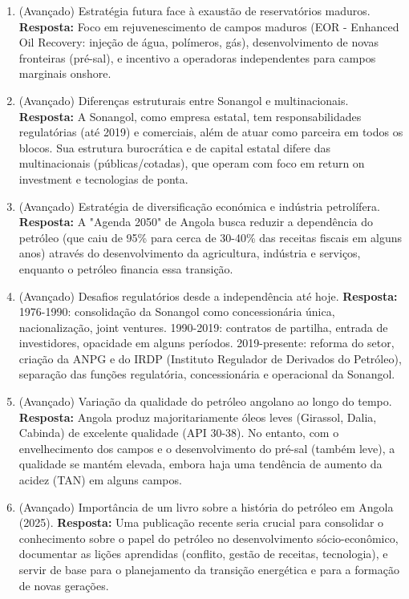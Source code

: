 \documentclass[11pt,a4paper]{article}
\begin{document}
\begin{enumerate}
  \item (Avançado) Estratégia futura face à exaustão de reservatórios maduros.
  \textbf{Resposta:} Foco em rejuvenescimento de campos maduros (EOR - Enhanced Oil Recovery: injeção de água, polímeros, gás), desenvolvimento de novas fronteiras (pré-sal), e incentivo a operadoras independentes para campos marginais onshore.

  \item (Avançado) Diferenças estruturais entre Sonangol e multinacionais.
  \textbf{Resposta:} A Sonangol, como empresa estatal, tem responsabilidades regulatórias (até 2019) e comerciais, além de atuar como parceira em todos os blocos. Sua estrutura burocrática e de capital estatal difere das multinacionais (públicas/cotadas), que operam com foco em return on investment e tecnologias de ponta.

  \item (Avançado) Estratégia de diversificação económica e indústria petrolífera.
  \textbf{Resposta:} A "Agenda 2050" de Angola busca reduzir a dependência do petróleo (que caiu de 95\% para cerca de 30-40\% das receitas fiscais em alguns anos) através do desenvolvimento da agricultura, indústria e serviços, enquanto o petróleo financia essa transição.

  \item (Avançado) Desafios regulatórios desde a independência até hoje.
  \textbf{Resposta:} 1976-1990: consolidação da Sonangol como concessionária única, nacionalização, joint ventures. 1990-2019: contratos de partilha, entrada de investidores, opacidade em alguns períodos. 2019-presente: reforma do setor, criação da ANPG e do IRDP (Instituto Regulador de Derivados do Petróleo), separação das funções regulatória, concessionária e operacional da Sonangol.

  \item (Avançado) Variação da qualidade do petróleo angolano ao longo do tempo.
  \textbf{Resposta:} Angola produz majoritariamente óleos leves (Girassol, Dalia, Cabinda) de excelente qualidade (API 30-38). No entanto, com o envelhecimento dos campos e o desenvolvimento do pré-sal (também leve), a qualidade se mantém elevada, embora haja uma tendência de aumento da acidez (TAN) em alguns campos.

  \item (Avançado) Importância de um livro sobre a história do petróleo em Angola (2025).
  \textbf{Resposta:} Uma publicação recente seria crucial para consolidar o conhecimento sobre o papel do petróleo no desenvolvimento sócio-econômico, documentar as lições aprendidas (conflito, gestão de receitas, tecnologia), e servir de base para o planejamento da transição energética e para a formação de novas gerações.


\end{enumerate}
\end{document}
